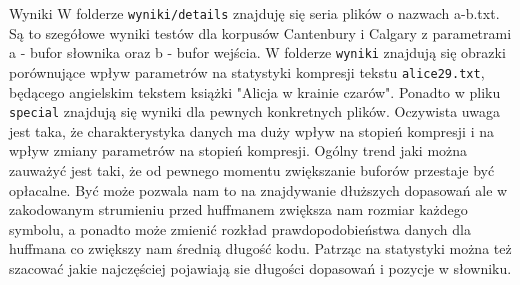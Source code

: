 \documentclass[11pt,leqno]{article}
\begin{document}
\begin{section}{Wyniki}
W folderze {\tt wyniki/details} znajduję się seria plików o nazwach a-b.txt. Są to szegółowe wyniki testów dla korpusów Cantenbury i Calgary z parametrami a - bufor słownika oraz b - bufor wejścia. W folderze {\tt wyniki} znajdują się obrazki porównujące wpływ parametrów na statystyki kompresji tekstu {\tt alice29.txt}, będącego angielskim tekstem książki "Alicja w krainie czarów". Ponadto w pliku {\tt special} znajdują się wyniki dla pewnych konkretnych plików. Oczywista uwaga jest taka, że charakterystyka danych ma duży wpływ na stopień kompresji i na wpływ zmiany parametrów na stopień kompresji. Ogólny trend jaki można zauważyć jest taki, że od pewnego momentu zwiększanie buforów przestaje być opłacalne. Być może pozwala nam to na znajdywanie dłuższych dopasowań ale w zakodowanym strumieniu przed huffmanem zwiększa nam rozmiar każdego symbolu, a ponadto może zmienić rozkład prawdopodobieństwa danych dla huffmana co zwiększy nam średnią długość kodu. Patrząc na statystyki można też szacować jakie najczęściej pojawiają sie długości dopasowań i pozycje w słowniku.
\end{section}
\end{document}
